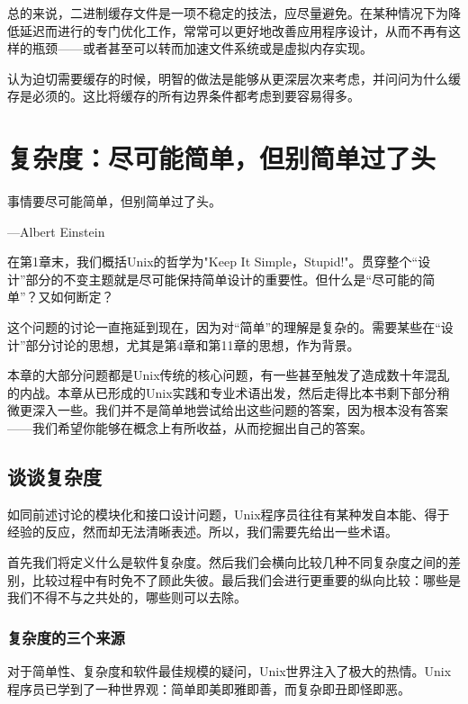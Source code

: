 \documentclass[12pt,oneside]{ctexbook}
\begin{document}
\begin{common-format}
总的来说，二进制缓存文件是一项不稳定的技法，应尽量避免。在某种情况下为降低延迟而进行的专门优化工作，常常可以更好地改善应用程序设计，从而不再有这样的瓶颈——或者甚至可以转而加速文件系统或是虚拟内存实现。

认为迫切需要缓存的时候，明智的做法是能够从更深层次来考虑，并问问为什么缓存是必须的。这比将缓存的所有边界条件都考虑到要容易得多。



\chapter{复杂度：尽可能简单，但别简单过了头}
\begin{flushright}
\begin{notecard}{15em}
事情要尽可能简单，但别简单过了头。

{\hfill —Albert Einstein}
\end{notecard}
\end{flushright}

在第1章末，我们概括Unix的哲学为"Keep It Simple，Stupid!"。贯穿整个“设计”部分的不变主题就是尽可能保持简单设计的重要性。但什么是“尽可能的简单”？又如何断定？

这个问题的讨论一直拖延到现在，因为对“简单”的理解是复杂的。需要某些在“设计”部分讨论的思想，尤其是第4章和第11章的思想，作为背景。

本章的大部分问题都是Unix传统的核心问题，有一些甚至触发了造成数十年混乱的内战。本章从已形成的Unix实践和专业术语出发，然后走得比本书剩下部分稍微更深入一些。我们并不是简单地尝试给出这些问题的答案，因为根本没有答案——我们希望你能够在概念上有所收益，从而挖掘出自己的答案。


\section{谈谈复杂度}
如同前述讨论的模块化和接口设计问题，Unix程序员往往有某种发自本能、得于经验的反应，然而却无法清晰表述。所以，我们需要先给出一些术语。

首先我们将定义什么是软件复杂度。然后我们会横向比较几种不同复杂度之间的差别，比较过程中有时免不了顾此失彼。最后我们会进行更重要的纵向比较：哪些是我们不得不与之共处的，哪些则可以去除。

\subsection{复杂度的三个来源}
对于简单性、复杂度和软件最佳规模的疑问，Unix世界注入了极大的热情。Unix程序员已学到了一种世界观：简单即美即雅即善，而复杂即丑即怪即恶。


\end{common-format}
\end{document}
